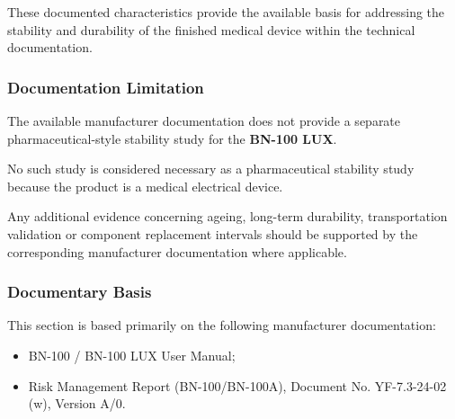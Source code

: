These documented characteristics provide the available basis for addressing
the stability and durability of the finished medical device within the
technical documentation.

\subsubsection{Documentation Limitation}

The available manufacturer documentation does not provide a separate
pharmaceutical-style stability study for the \textbf{BN-100 LUX}.

No such study is considered necessary as a pharmaceutical stability study
because the product is a medical electrical device.

Any additional evidence concerning ageing, long-term durability,
transportation validation or component replacement intervals should be
supported by the corresponding manufacturer documentation where applicable.

\subsubsection{Documentary Basis}

This section is based primarily on the following manufacturer documentation:

\begin{itemize}

    \item BN-100 / BN-100 LUX User Manual;

    \item Risk Management Report (BN-100/BN-100A), Document No.
    YF-7.3-24-02 (w), Version A/0.

\end{itemize}
